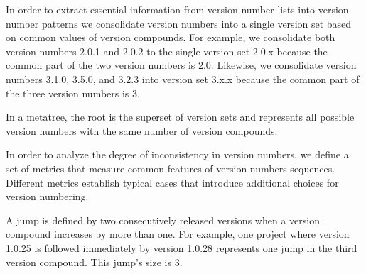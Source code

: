 \documentclass[conference]{IEEEtran}
\begin{document}
In order to extract essential information from version number lists into version number patterns we consolidate version numbers into a single version set based on common values of version compounds.
For example, we consolidate both version numbers 2.0.1 and 2.0.2 to the single version set 2.0.x because the common part of the two version numbers is 2.0.
 Likewise, we consolidate version numbers 3.1.0, 3.5.0, and 3.2.3 into version set 3.x.x because the common part of the three version numbers is 3.

 In a metatree, the root is the superset of version sets and represents all possible version numbers with the same number of version compounds.










In order to analyze the degree of inconsistency in version numbers, we define 
a set of metrics that measure common features of version numbers sequences. Different metrics establish typical cases that introduce additional choices for version numbering. 
 
 
 
 
 A jump is defined by two consecutively released versions when a version compound increases by more than one.
For example, one project where version 1.0.25 is followed immediately by version 1.0.28 represents one jump in the third version compound. This jump's size is 3.
\end{document}
